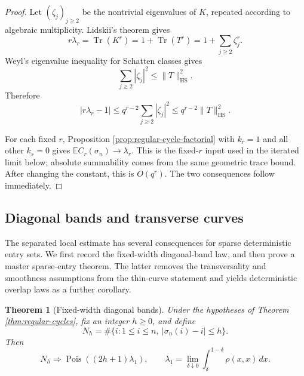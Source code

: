 \documentclass[11pt]{article}
\newtheorem{theorem}{Theorem}[section]
\theoremstyle{remark}
\newcommand{\Ee}{\mathbb E}
\newcommand{\Pois}{\operatorname{Pois}}
\newcommand{\dd}{\,d}
\begin{document}
\begin{proof}
Let $(\zeta_j)_{j\ge2}$ be the nontrivial eigenvalues of $K$, repeated according
to algebraic multiplicity.  Lidskii's theorem \cite[Theorem~3.7]{Simon2005} gives
\[
        r\lambda_r=\operatorname{Tr}(K^r)
        =1+\operatorname{Tr}(T^r)
        =1+\sum_{j\ge2}\zeta_j^r.
\]
Weyl's eigenvalue inequality for Schatten classes
\cite[Theorem~2.3]{Simon2005} gives
\[
        \sum_{j\ge2}|\zeta_j|^2\le\|T\|_{\mathrm{HS}}^2.
\]
Therefore
\[
        \left|r\lambda_r-1\right|
        \le q^{r-2}\sum_{j\ge2}|\zeta_j|^2
        \le q^{r-2}\|T\|_{\mathrm{HS}}^2.
\]

For each fixed \(r\), Proposition \ref{prop:regular-cycle-factorial} with
\(k_r=1\) and all other \(k_s=0\) gives
\(\Ee C_r(\sigma_n)\to\lambda_r\).  This is the fixed-\(r\) input used in
the iterated limit below; absolute summability comes from the same geometric
trace bound.
After changing the constant, this is $O(q^r)$.  The two consequences follow
immediately.
\end{proof}


\subsection{Diagonal bands and transverse curves}\label{subsec:regular-diagonal-consequences}

The separated local estimate has several consequences for sparse deterministic
entry sets.  We first record the fixed-width diagonal-band law, and then prove a
master sparse-entry theorem.  The latter removes the transversality and
smoothness assumptions from the thin-curve statement and yields deterministic
overlap laws as a further corollary.

\begin{theorem}[Fixed-width diagonal bands]\label{thm:diagonal-band}
Under the hypotheses of Theorem \ref{thm:regular-cycles}, fix an integer
\(h\ge0\), and define
\[
        N_h=\#\{i:1\le i\le n,\ |\sigma_n(i)-i|\le h\}.
\]
Then
\[
        N_h\Rightarrow
        \Pois\left((2h+1)\lambda_1\right),
        \qquad
        \lambda_1=\lim_{\delta\downarrow0}
        \int_\delta^{1-\delta}\rho(x,x)\dd x .
\]
\end{theorem}
\end{document}
